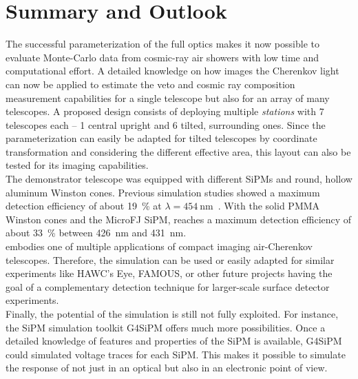 \chapter{Summary and Outlook}

The successful parameterization of the full \iceact optics makes it now possible to evaluate Monte-Carlo data from cosmic-ray air showers with low time and computational effort. A detailed knowledge on how \iceact images the Cherenkov light can now be applied to estimate the veto and cosmic ray composition measurement capabilities for a single telescope but also for an array of many \iceact telescopes. A proposed design consists of deploying multiple \iceact \textit{stations} with 7 telescopes each -- 1 central upright and 6 tilted, surrounding ones. Since the parameterization can easily be adapted for tilted telescopes by coordinate transformation and considering the different effective area, this layout can also be tested for its imaging capabilities.\\

The \iceact demonstrator telescope was equipped with different SiPMs and round, hollow aluminum Winston cones. Previous simulation studies showed a maximum detection efficiency of about \SI{19}{\percent} at $\lambda = \SI{454}{\nano\meter}$~\cite{famous:niggemann}. With the solid PMMA Winston cones and the MicroFJ SiPM, \iceact reaches a maximum detection efficiency of about \SI{33}{\percent} between \SI{426}{\nano\meter} and \SI{431}{\nano\meter}.\\

\iceact embodies one of multiple applications of compact imaging air-Cherenkov telescopes. Therefore, the simulation can be used or easily adapted for similar experiments like HAWC's Eye, FAMOUS, or other future projects having the goal of a complementary detection technique for larger-scale surface detector experiments.\\

Finally, the potential of the \geant simulation is still not fully exploited. For instance, the SiPM simulation toolkit G4SiPM offers much more possibilities. Once a detailed knowledge of features and properties of the \iceact SiPM is available, G4SiPM could simulated voltage traces for each SiPM. This makes it possible to simulate the response of \iceact not just in an optical but also in an electronic point of view.